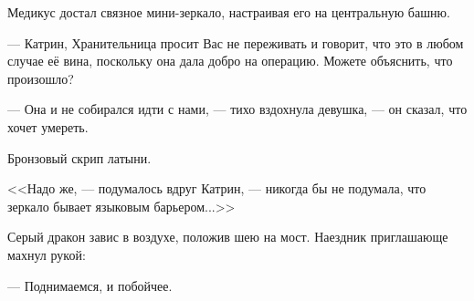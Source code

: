 Медикус достал связное мини-зеркало, настраивая его на центральную башню.

--- Катрин, Хранительница просит Вас не переживать и говорит, что это в любом случае её вина,
поскольку она дала добро на операцию. Можете объяснить, что произошло?

--- Она и не собирался идти с нами, --- тихо вздохнула девушка, --- он сказал, что хочет умереть.

Бронзовый скрип латыни.

<<Надо же, --- подумалось вдруг Катрин, --- никогда бы не подумала, что зеркало бывает языковым барьером...>>

\emptypar

Серый дракон завис в воздухе, положив шею на мост. Наездник приглашающе махнул рукой:

--- Поднимаемся, и побойчее.


